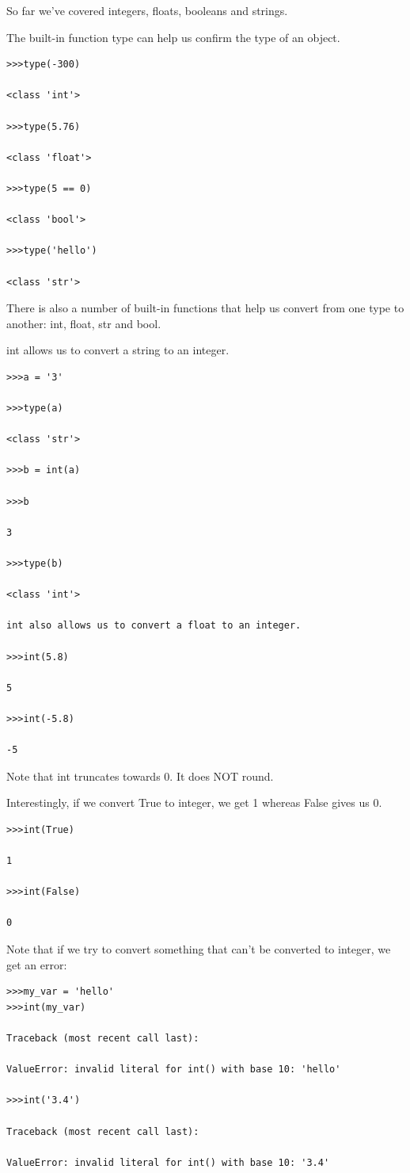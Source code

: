 \documentclass{article}
\begin{document}
So far we've covered integers, floats, booleans and strings. 

The built-in function type can help us confirm the type of an object.

\begin{lstlisting}
>>>type(-300)

<class 'int'>

>>>type(5.76)

<class 'float'>

>>>type(5 == 0)

<class 'bool'>

>>>type('hello')

<class 'str'>
\end{lstlisting}

There is also a number of built-in functions that help us convert from one type to another:  int, float, str and bool.

int allows us to convert a string to an integer. 
\begin{lstlisting}
>>>a = '3'

>>>type(a)

<class 'str'>

>>>b = int(a)

>>>b

3

>>>type(b)

<class 'int'>

int also allows us to convert a float to an integer.

>>>int(5.8)

5

>>>int(-5.8)

-5
\end{lstlisting}

Note that int truncates towards 0.  It does NOT round.

Interestingly, if we convert True to integer, we get 1 whereas False gives us 0.
\begin{lstlisting}
>>>int(True)

1

>>>int(False)

0
\end{lstlisting}

Note that if we try to convert something that can't be converted to integer, we get an error: 
\begin{lstlisting}
>>>my_var = 'hello'
>>>int(my_var)

Traceback (most recent call last):

ValueError: invalid literal for int() with base 10: 'hello'

>>>int('3.4')

Traceback (most recent call last):

ValueError: invalid literal for int() with base 10: '3.4'
\end{lstlisting}
\end{document}
